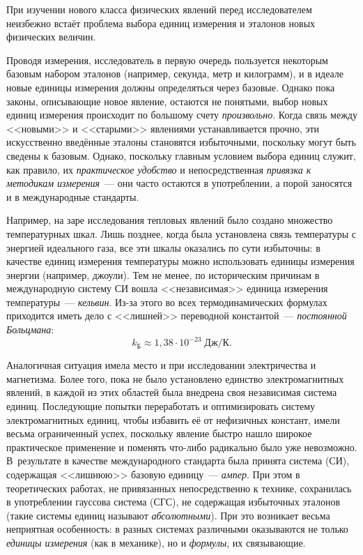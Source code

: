 \label{sec:app_units}

При изучении нового класса физических явлений перед исследователем
неизбежно встаёт проблема выбора единиц измерения и эталонов новых
физических величин.

Проводя измерения, исследователь в первую очередь пользуется некоторым
базовым набором эталонов (например, секунда, метр и килограмм), и
в идеале новые единицы измерения должны определяться через базовые.
Однако пока законы, описывающие новое явление, остаются не понятыми,
выбор новых единиц измерения происходит по большому счету \emph{произвольно}.
Когда связь между <<новыми>> и <<старыми>>
явлениями устанавливается прочно, эти искусственно введённые эталоны
становятся избыточными, поскольку могут быть сведены к базовым. Однако,
поскольку главным условием выбора единиц служит, как правило,
их \emph{практическое удобство} и непосредственная
\emph{привязка к методикам измерения}~--- они часто остаются в употреблении,
а порой заносятся и в международные стандарты.

Например, на заре исследования тепловых явлений было создано множество
температурных шкал. Лишь позднее, когда была установлена связь температуры
с энергией идеального газа, все эти шкалы оказались по сути избыточны:
в качестве единиц измерения температуры можно использовать единицы
измерения энергии (например, джоули). Тем не менее, по историческим
причинам в международную систему СИ вошла <<независимая>>
единица измерения температуры~--- \emph{кельвин}. Из-за этого во
всех термодинамических формулах приходится иметь дело с <<лишней>>
переводной константой~--- \emph{постоянной Больцмана}:
\[
k_{\text{Б}}\approx 1{,}38\cdot10^{-23}\;\text{Дж}/\text{К}.
\]

Аналогичная ситуация имела место и при исследовании электричества
и магнетизма. Более того, пока не было установлено единство электромагнитных
явлений, в каждой из этих областей была внедрена своя независимая
система единиц. Последующие попытки переработать и оптимизировать
систему электромагнитных единиц, чтобы избавить её от нефизичных
констант, имели весьма ограниченный успех, поскольку явление быстро
нашло широкое практическое применение и поменять что-либо радикально
было уже невозможно. В~результате в качестве международного стандарта
была принята система (СИ), содержащая <<лишнюю>>
базовую единицу~--- \emph{ампер}. При этом в теоретических работах,
не привязанных непосредственно к технике, сохранилась в употреблении
гауссова система (СГС), не содержащая избыточных эталонов (такие системы
единиц называют \emph{абсолютными}). При это возникает весьма неприятная
особенность: в разных системах различными оказываются не только 
\emph{единицы измерения} (как в механике), но и \emph{формулы}, их связывающие.


